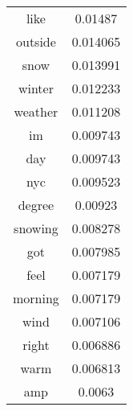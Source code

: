 \documentclass[12pt]{amsart}
\newcommand{\0}{\mat{0}}
\newcommand{\1}{\mathds{1}}
\begin{document}
\begin{table}[!h]
\begin{minipage}{.5\linewidth}
{\begin{tabular}{|c|c|}
                like & 0.01487 \\
                outside & 0.014065 \\
                snow & 0.013991 \\
                winter & 0.012233 \\
                weather & 0.011208 \\
                im & 0.009743 \\
                day & 0.009743 \\
                nyc & 0.009523 \\
                degree & 0.00923 \\
                snowing & 0.008278 \\
                got & 0.007985 \\
                feel & 0.007179 \\
                morning & 0.007179 \\
                wind & 0.007106 \\
                right & 0.006886 \\
                warm & 0.006813 \\
                amp & 0.0063 \\
                \hline
        	\end{tabular}
        }
    \end{minipage} 
\end{table}

\bigskip
\end{document}
